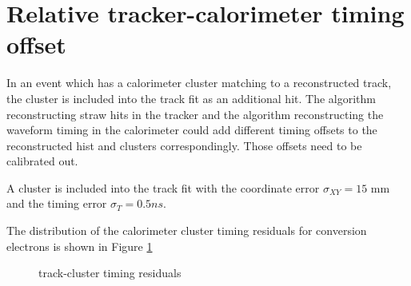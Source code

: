 \section{Relative tracker-calorimeter timing offset}

In an event which has a calorimeter cluster matching to a reconstructed track, the
cluster is included into the track fit as an additional hit. The algorithm reconstructing 
straw hits in the tracker and the algorithm reconstructing the waveform timing in the calorimeter
could add different timing offsets to the reconstructed hist and clusters correspondingly.
Those offsets need to be calibrated out.

A cluster is included into the track fit with the coordinate error $\sigma_{XY} = 15$ mm
and the timing error $\sigma_T = 0.5ns$.

The distribution of the calorimeter cluster timing residuals for conversion electrons
is shown in Figure \ref{fig:track_cluster_dt_default}

\begin{figure}
\caption{
  \label{fig:track_cluster_dt_default}
  track-cluster timing residuals
}
\end{figure}

